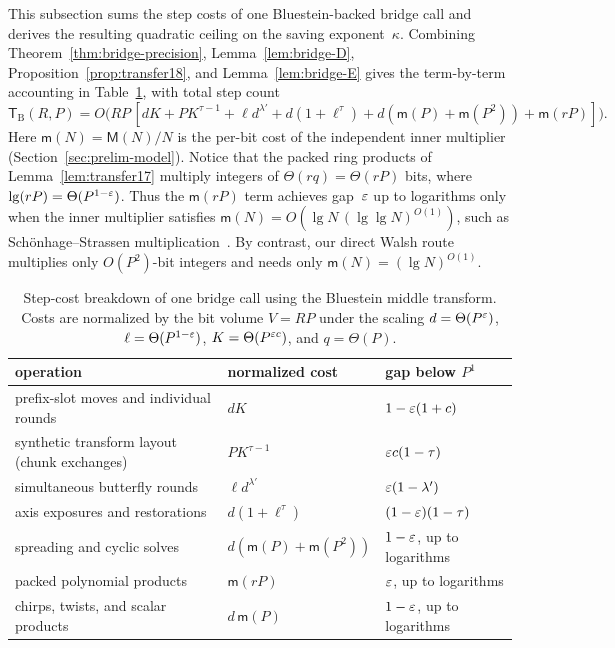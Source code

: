 This subsection sums the step costs of one Bluestein-backed bridge call and derives the resulting quadratic ceiling on the saving exponent~$\kappa$. Combining Theorem~\ref{thm:bridge-precision}, Lemma~\ref{lem:bridge-D}, Proposition~\ref{prop:transfer18}, and Lemma~\ref{lem:bridge-E} gives the term-by-term accounting in Table~\ref{tab:cost-bluestein}, with total step count
\begin{equation}\label{eq:cost-B}
  \mathsf T_{\mathrm B}(R,P)=O\bigl(RP\,[dK+PK^{\tau-1}+\ell d^{\lambda'}+d(1+\ell^\tau)+d(\mathsf m(P)+\mathsf m(P^2))
  +\mathsf m(rP)]\bigr).
\end{equation}
Here $\mathsf m(N)=\mathsf M(N)/N$ is the per-bit cost of the independent inner multiplier (Section~\ref{sec:prelim-model}). Notice that the packed ring products of Lemma~\ref{lem:transfer17} multiply integers of $\Theta(rq)=\Theta(rP)$ bits, where $\lg(rP)=\Theta(P^{1-\varepsilon})$. Thus the $\mathsf m(rP)$ term achieves gap~$\varepsilon$ up to logarithms only when the inner multiplier satisfies $\mathsf m(N)=O(\lg N\,(\lg\lg N)^{O(1)})$, such as Sch\"onhage--Strassen multiplication~\cite{SS71}. By contrast, our direct Walsh route multiplies only $O(P^2)$-bit integers and needs only $\mathsf m(N)=(\lg N)^{O(1)}$.

\begin{table}[htbp]
\centering\small
\caption{Step-cost breakdown of one bridge call using the Bluestein middle transform. Costs are normalized by the bit volume $V=RP$ under the scaling $d=\Theta(P^\varepsilon)$, $\ell=\Theta(P^{1-\varepsilon})$, $K=\Theta(P^{\varepsilon c})$, and $q=\Theta(P)$.}\label{tab:cost-bluestein}
\begin{tabular}{@{}lll@{}}
\toprule
operation & normalized cost & gap below $P^1$\\
\midrule
prefix-slot moves and individual rounds & $dK$ & $1-\varepsilon(1+c)$\\
synthetic transform layout (chunk exchanges) & $PK^{\tau-1}$ & $\varepsilon c(1-\tau)$\\
simultaneous butterfly rounds & $\ell d^{\lambda'}$ & $\varepsilon(1-\lambda')$\\
axis exposures and restorations & $d(1+\ell^\tau)$ & $(1-\varepsilon)(1-\tau)$\\
spreading and cyclic solves & $d(\mathsf m(P)+\mathsf m(P^2))$ & $1-\varepsilon$, up to logarithms\\
packed polynomial products & $\mathsf m(rP)$ & $\varepsilon$, up to logarithms\\
chirps, twists, and scalar products & $d\,\mathsf m(P)$ & $1-\varepsilon$, up to logarithms\\
\bottomrule
\end{tabular}
\end{table}

